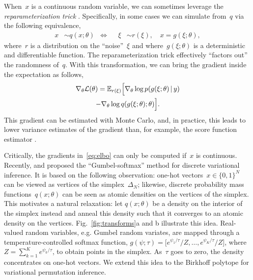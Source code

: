 \documentclass[twoside]{article}
\begin{document}
When~$x$ is a continuous random variable, we can sometimes leverage the \emph{reparameterization trick}
\citep{Salimans2013, Kingma2014}.  Specifically, in some cases we can
simulate from~$q$ via the following equivalence,
\begin{align*}
  x &\sim q(x; \theta)
      & \iff & &  
  \xi &\sim r(\xi), \quad x = g(\xi;\theta),
\end{align*}
where~$r$ is a distribution on the ``noise''~$\xi$ and
where~$g(\xi; \theta)$ is a deterministic and differentiable
function.
The reparameterization trick effectively ``factors out'' the randomness
of~$q$. With this transformation, we can bring the gradient inside the
expectation as follows,
\begin{multline}
  \label{eq:elbo}
  \nabla_\theta \mathcal{L}(\theta) 
  = \mathbb{E}_{r(\xi)} \Big[ \nabla_\theta \log p(g(\xi; \theta) \, | \, y) \\
    - \nabla_\theta  \log q(g(\xi; \theta); \theta) \Big].
\end{multline}
This gradient can be estimated with Monte Carlo, and, in practice,
this leads to lower variance estimates of the gradient than, for
example, the score function estimator \citep{Williams1992, Glynn1990}.

Critically, the gradients in~\eqref{eq:elbo} can only be computed
if~$x$ is continuous. Recently, \citep{maddison2016concrete} and
\citep{jang2016categorical} proposed the ``Gumbel-softmax'' method for
discrete variational inference. It is based on the following
observation: one-hot vectors~${x \in \{0,1\}^N}$ can be
viewed as vertices of the simplex~$\Delta_N$; likewise, discrete
probability mass functions~$q(x; \theta)$ can be seen as atomic
densities on the vertices of the simplex.  This motivates a natural
relaxation: let $q(x; \theta)$ be a density on the interior of the
simplex instead and anneal this density such that it converges to an
atomic density on the vertices. Fig.~\ref{fig:transforms}a and b
illustrate this idea. Real-valued random variables, e.g. Gumbel random
variates, are mapped through a temperature-controlled softmax
function,
${g(\psi; \tau) = \big[e^{\psi_1 / \tau}/Z, \ldots, e^{\psi_K /
    \tau}/Z \big]}$, where~$Z=\sum_{k=1}^K e^{\psi_k / \tau}$, to
obtain points in the simplex. As~$\tau$ goes to zero, the density
concentrates on one-hot vectors.  We extend this idea to the Birkhoff
polytope for variational permutation inference.
\end{document}
